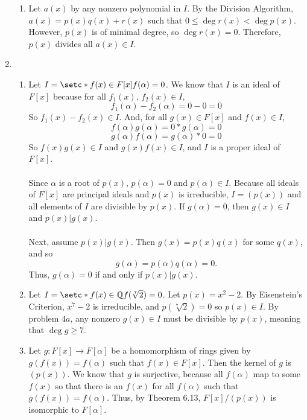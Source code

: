 \documentclass{article}
\begin{document}
\begin{enumerate}
\begin{enumerate}
\item Let $a(x)$ by any nonzero polynomial in $I$.  By the Division Algorithm,
$a(x) = p(x)q(x) + r(x)$ such that $0 \leq \deg{r(x)} < \deg{p(x)}$.  However,
$p(x)$ is of minimal degree, so $\deg{r(x)} = 0$.  Therefore, $p(x)$ divides
all $a(x) \in I$.

\end{enumerate}

\item
\begin{enumerate}
\item
Let $I = \setc*{ f(x) \in F[x]}{f(\alpha) = 0 }$.  We know that $I$ is an ideal of
$F[x]$ because for all $f_{1}(x)$, $f_{2}(x) \in I$,
\[
f_{1}(\alpha) - f_{2}(\alpha) = 0-0 = 0
\]
So $f_{1}(x) - f_{2}(x) \in I$.  And, for all $g(x) \in F[x]$ and $f(x) \in I$,
\[
f(\alpha)g(\alpha) = 0*g(\alpha) = 0
\] \[
g(\alpha)f(\alpha) = g(\alpha)*0 = 0
\]
So $f(x)g(x) \in I$ and $g(x)f(x) \in I$, and $I$ is a proper ideal of $F[x]$.
\\ \\
Since $\alpha$ is a root of $p(x)$, $p(\alpha) = 0$ and $p(\alpha) \in I$.
Because all ideals of $F[x]$ are principal ideals and $p(x)$ is irreducible,
$I = (p(x))$ and all elements of $I$ are divisible by $p(x)$.  If $g(\alpha) = 0$,
then $g(x) \in I$ and $p(x) | g(x)$.
\\
\\
Next, assume $p(x) | g(x)$.  Then $g(x) = p(x)q(x)$ for some $q(x)$, and so
\[
g(\alpha) = p(\alpha)q(\alpha) = 0.
\]
Thus, $g(\alpha) = 0$ if and only if $p(x) | g(x)$.

\item Let $I = \setc*{f(x) \in \mathbb{Q}}{f(\sqrt[7]{2}) = 0}$.
Let $p(x) = x^2 - 2$.  By Eisenstein's Criterion, $x^7 - 2$ is irreducible, and
$p(\sqrt[7]{2}) = 0$ so $p(x) \in I$.  By problem $4a$, any nonzero
$g(x) \in I$ must be divisible by $p(x)$, meaning that $\deg{g} \geq 7$.

\item Let $g:F[x] \rightarrow F[\alpha]$ be a homomorphism of rings
given by $g(f(x)) = f(\alpha)$ such that $f(x) \in F[x]$.  Then the kernel of
$g$ is $(p(x))$.  We know that $g$ is surjective, because all $f(\alpha)$ map to
some $f(x)$ so that there is an $f(x)$ for all $f(\alpha)$ such that
$g(f(x)) = f(\alpha)$.  Thus, by Theorem 6.13, $F[x]/(p(x))$ is isomorphic
to $F[\alpha]$.

\end{enumerate}
\end{enumerate}
\end{document}
